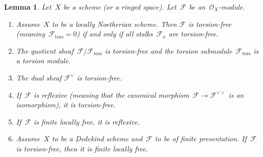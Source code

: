 \documentclass[10pt,reqno,a4paper]{amsbook}
\theoremstyle{definition}
\theoremstyle{plain}
\newtheorem{lemma}[defn]{Lemma}
\theoremstyle{remark}
\newcommand{\F}{\mathcal{F}}
\renewcommand{\O}{\mathcal{O}}
\newcommand{\tors}{\mathrm{tors}}
\newcommand{\?}{\,{:}\,}
\renewcommand{\_}{\mathpunct{.}\,}
\begin{document}
\begin{lemma}\label{lemma:torsion-stuff}
Let~$X$ be a scheme (or a ringed space). Let~$\F$ be
an~$\O_X$-module.
\begin{enumerate}
\item Assume~$X$ to be a locally Noetherian scheme. Then $\F$ is torsion-free
(meaning~$\F_\tors = 0$) if and only if all stalks~$\F_x$ are torsion-free.
\item The quotient sheaf~$\F/\F_\tors$ is torsion-free and the torsion
submodule~$\F_\tors$ is a torsion module.
\item The dual sheaf $\F^\vee$ is torsion-free.
\item If~$\F$ is reflexive (meaning that the canonical morphism~$\F \to
\F^{\vee\vee}$ is an isomorphism), it is torsion-free.
\item If~$\F$ is finite locally free, it is reflexive.
\item Assume~$X$ to be a Dedekind scheme and~$\F$ to be of finite presentation.
If~$\F$ is torsion-free, then it is finite locally free.
\end{enumerate}
\end{lemma}
\end{document}
